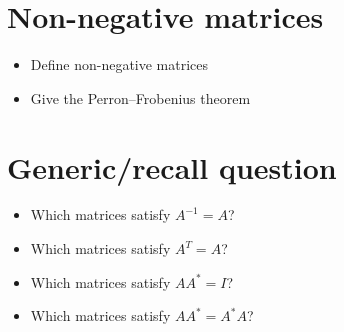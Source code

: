\documentclass[a4paper]{article}
\begin{document}
\section{Non-negative matrices}

\begin{itemize}
  \item Define non-negative matrices
  \item Give the Perron--Frobenius theorem
\end{itemize}

\section{Generic/recall question}

\begin{itemize}
  \item Which matrices satisfy $A^{-1} = A$?
  \item Which matrices satisfy $A^{T} = A$?
  \item Which matrices satisfy $AA^* = I$?
  \item Which matrices satisfy $AA^* = A^*A$?
\end{itemize}
\end{document}
